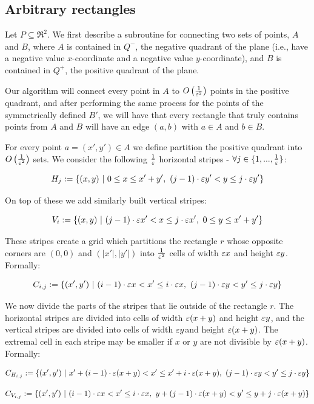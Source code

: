 \documentclass[12pt]{article}%
\begin{document}
\subsection{Arbitrary rectangles}

Let $P\subseteq \Re^2$. We first describe a subroutine for connecting two sets of points, $A$ and $B$, where $A$ is contained in $Q^-$, the negative quadrant of the plane (i.e., have a negative value $x$-coordinate and a negative value $y$-coordinate), and $B$ is contained in $Q^+$, the positive quadrant of the plane. 

Our algorithm will connect every point in $A$ to $O\left(\frac{1}{\varepsilon^2}\right)$ points in the positive quadrant, and after performing the same process for the points of the symmetrically defined $B'$, we will have that every rectangle that truly contains points from $A$ and $B$ will have an edge $(a,b)$ with $a\in A$ and $b\in B$.

For every point $a = (x',y') \in A$ we define partition the positive quadrant into $O\left(\frac{1}{\varepsilon^2}\right)$ sets. We consider the following $\frac{1}{\varepsilon}$ horizontal stripes - $\forall j\in \{1,...,\frac{1}{\varepsilon}\}$:

$$H_{j}:=\{(x,y)~|~  0 \leq x \leq x'+y'  ,~ (j-1)\cdot \varepsilon y' < y \leq j\cdot \varepsilon y'\}$$

On top of these we add similarly built vertical stripes:

$$V_{i}:=\{(x,y)~|~ (j-1)\cdot \varepsilon x' < x \leq j\cdot \varepsilon x',~ 0 \leq y \leq x'+y' \}$$

These stripes create a grid which partitions the rectangle $r$ whose opposite corners are $(0,0)$ and $(|x'|,|y'|)$ into $\frac{1}{\varepsilon^2}$ cells of width $\varepsilon x$ and height $\varepsilon y$. Formally:

$$C_{i,j}:=\{(x',y')~|~  (i-1)\cdot \varepsilon x < x' \leq i\cdot \varepsilon x,~ (j-1)\cdot \varepsilon y< y' \leq j\cdot \varepsilon y\}$$

We now divide the parts of the stripes that lie outside of the rectangle $r$. The horizontal stripes are divided into cells of width $\varepsilon(x+y)$ and height $\varepsilon y$, and the vertical stripes are divided into cells of width $\varepsilon y$and height $\varepsilon(x+y)$. The extremal cell in each stripe may be smaller if $x$ or $y$ are not divisible by $\varepsilon(x+y)$. Formally:

$$C_{H_{i,j}}:=\{(x',y')~|~  x' + (i-1)\cdot \varepsilon (x+y) < x' \leq x' + i\cdot \varepsilon (x+y),~ (j-1)\cdot \varepsilon y< y' \leq j\cdot \varepsilon y\}$$

$$C_{V_{i,j}}:=\{(x',y')~|~  (i-1)\cdot \varepsilon x < x' \leq i\cdot \varepsilon x,~ y + (j-1)\cdot \varepsilon (x+y)< y' \leq y + j\cdot \varepsilon (x+y)\}$$
\end{document}
